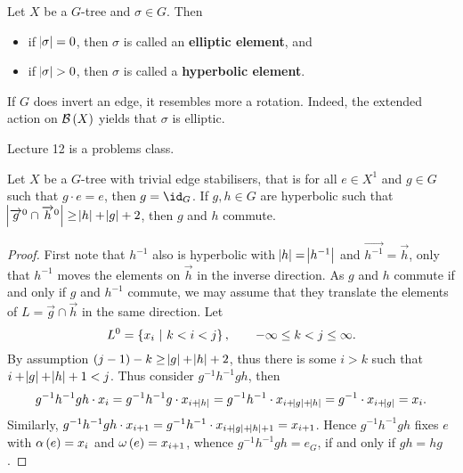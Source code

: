 \begin{definition}
Let $ X $ be a $ G $-tree and $ \sigma \in G $. Then
\begin{itemize}
\item if $ \abs{\sigma} = 0 $, then $ \sigma $ is called an \textbf{elliptic element}, and
\item if $ \abs{\sigma} > 0 $, then $ \sigma $ is called a \textbf{hyperbolic element}.
\end{itemize}
\end{definition}

\pagebreak

\begin{remark}
If $ G $ does invert an edge, it resembles more a rotation. Indeed, the extended action on $ \BBB\br{X} $ yields that $ \sigma $ is elliptic.
\end{remark}


Lecture 12 is a problems class.


\begin{lemma}
Let $ X $ be a $ G $-tree with trivial edge stabilisers, that is for all $ e \in X^1 $ and $ g \in G $ such that $ g \cdot e = e $, then $ g = \id_G $. If $ g, h \in G $ are hyperbolic such that $ \abs{\overrightarrow{g}^0 \cap \overrightarrow{h}^0} \ge \abs{h} + \abs{g} + 2 $, then $ g $ and $ h $ commute.
\end{lemma}

\begin{proof}
First note that $ h^{-1} $ also is hyperbolic with $ \abs{h} = \abs{h^{-1}} $ and $ \overrightarrow{h^{-1}} = \overrightarrow{h} $, only that $ h^{-1} $ moves the elements on $ \overrightarrow{h} $ in the inverse direction. As $ g $ and $ h $ commute if and only if $ g $ and $ h^{-1} $ commute, we may assume that they translate the elements of $ L = \overrightarrow{g} \cap \overrightarrow{h} $ in the same direction. Let
$$ L^0 = \cbr{x_i \st k < i < j}, \qquad -\infty \le k < j \le \infty. $$
By assumption $ \br{j - 1} - k \ge \abs{g} + \abs{h} + 2 $, thus there is some $ i > k $ such that $ i + \abs{g} + \abs{h} + 1 < j $. Thus consider $ g^{-1}h^{-1}gh $, then
$$ g^{-1}h^{-1}gh \cdot x_i = g^{-1}h^{-1}g \cdot x_{i + \abs{h}} = g^{-1}h^{-1} \cdot x_{i + \abs{g} + \abs{h}} = g^{-1} \cdot x_{i + \abs{g}} = x_i. $$
Similarly, $ g^{-1}h^{-1}gh \cdot x_{i + 1} = g^{-1}h^{-1} \cdot x_{i + \abs{g} + \abs{h} + 1} = x_{i + 1} $. Hence $ g^{-1}h^{-1}gh $ fixes $ e $ with $ \alpha\br{e} = x_i $ and $ \omega\br{e} = x_{i + 1} $, whence $ g^{-1}h^{-1}gh = e_G $, if and only if $ gh = hg $.
\end{proof}

